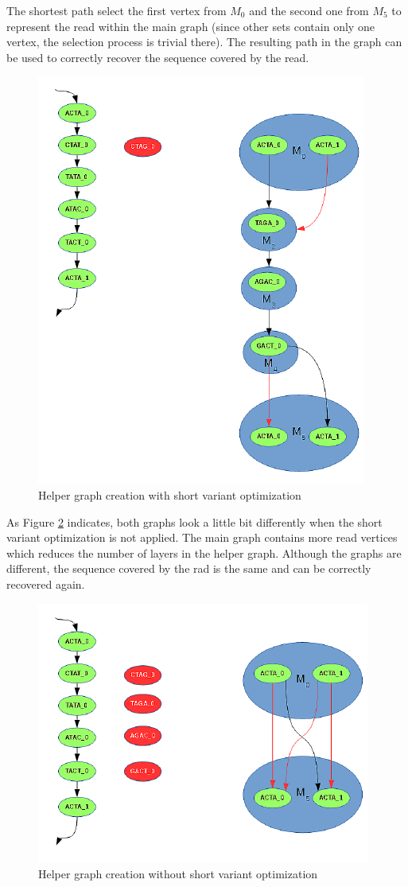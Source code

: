 The shortest path select the first vertex from $M_0$ and the second one from $M_5$ to represent the read within the main graph (since other sets contain only one vertex, the selection process is trivial there). The resulting path in the graph can be used to correctly recover the sequence covered by the read.

\begin{figure}
	\centering
	\includegraphics{img/helper-graph-short.pdf}
	\caption{Helper graph creation with short variant optimization}
	\label{fig:helper-graph-short}
\end{figure}

As Figure \ref{fig:helper-graph} indicates, both graphs look a little bit differently when the short variant optimization is not applied. The main graph contains more read vertices which reduces the number of layers in the helper graph. Although the graphs are different, the sequence covered by the rad is the same and can be correctly recovered again.

\begin{figure}
	\centering
	\includegraphics{img/helper-graph.pdf}
	\caption{Helper graph creation without short variant optimization}
	\label{fig:helper-graph}
\end{figure}

